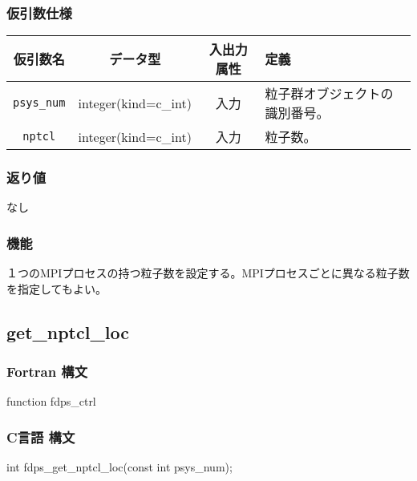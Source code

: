 \subsubsection*{仮引数仕様}
\begin{table}[h]
\begin{tabularx}{\linewidth}{cccX}
\toprule
\rowcolor{Snow2}
仮引数名 & データ型 & 入出力属性 & 定義 \\
\midrule
\texttt{psys\_num} & integer(kind=c\_int) & 入力 & 粒子群オブジェクトの識別番号。\\
\texttt{nptcl} & integer(kind=c\_int) & 入力 & 粒子数。\\
\bottomrule
\end{tabularx}
\end{table}

\subsubsection*{返り値}
なし

\subsubsection*{機能}
１つのMPIプロセスの持つ粒子数を設定する。MPIプロセスごとに異なる粒子数を指定してもよい。

\clearpage

\subsection{get\_nptcl\_loc}
\subsubsection*{Fortran 構文}
\begin{screen}
\begin{spverbatim}
function fdps_ctrl%
\end{spverbatim}
\end{screen}

\subsubsection*{C言語 構文}
\begin{screen}
\begin{spverbatim}
int fdps_get_nptcl_loc(const int psys_num);
\end{spverbatim}
\end{screen}


